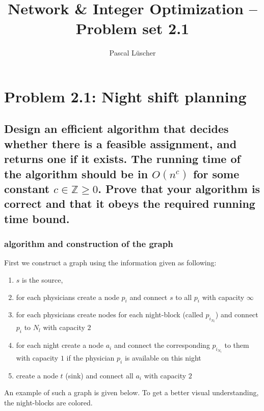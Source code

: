 \documentclass[12pt, a4]{article}
\author{Pascal Lüscher}
\title{Network \& Integer Optimization – Problem set 2.1}
\begin{document}
	\section{Problem 2.1: Night shift planning}
	
	\subsection{Design an efficient algorithm that decides whether there is a feasible assignment, and returns one if it exists. The running time of the algorithm should be in $O(n^c)$ for some constant $c\in\mathbb{Z}\geq0$. Prove that your algorithm is correct and that it obeys the required running time bound.}
	
	\subsubsection{algorithm and construction of the graph}
	First we construct a graph using the information given as following:
	
	\begin{enumerate}
		\item $s$ is the source, 
		\item for each physicians create a node $p_i$ and connect $s$ to all $p_i$ with capacity $\infty$
		\item for each physicians create nodes for each night-block (called $p_{i_{N_l}}$) and connect $p_i$ to $N_l$ with capacity $2$
		\item for each night create a node $a_i$ and connect the corresponding $p_{i_{N_l}}$ to them with capacity $1$ if the physician $p_i$ is available on this night
		\item create a node $t$ (sink) and connect all $a_i$ with capacity $2$
	\end{enumerate}

	An example of such a graph is given below. To get a better visual understanding, the night-blocks are colored.
\end{document}
